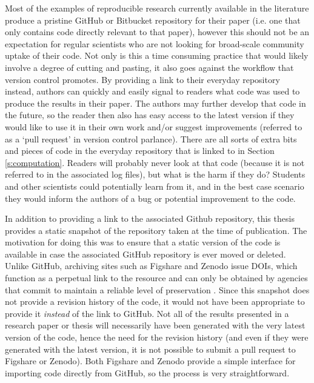Most of the examples of reproducible research currently available in the literature produce a pristine GitHub or Bitbucket repository for their paper (i.e. one that only contains code directly relevant to that paper), however this should not be an expectation for regular scientists who are not looking for broad-scale community uptake of their code. Not only is this a time consuming practice that would likely involve a degree of cutting and pasting, it also goes against the workflow that version control promotes. By providing a link to their everyday repository instead, authors can quickly and easily signal to readers what code was used to produce the results in their paper. The authors may further develop that code in the future, so the reader then also has easy access to the latest version if they would like to use it in their own work and/or suggest improvements (referred to as a `pull request' in version control parlance). There are all sorts of extra bits and pieces of code in the everyday repository that is linked to in Section \ref{s:computation}. Readers will probably never look at that code (because it is not referred to in the associated log files), but what is the harm if they do? Students and other scientists could potentially learn from it, and in the best case scenario they would inform the authors of a bug or potential improvement to the code.        

In addition to providing a link to the associated Github repository, this thesis provides \citep[on Figshare;][]{IrvingFigshare2016} a static snapshot of the repository taken at the time of publication. The motivation for doing this was to ensure that a static version of the code is available in case the associated GitHub repository is ever moved or deleted. Unlike GitHub, archiving sites such as Figshare and Zenodo issue DOIs, which function as a perpetual link to the resource and can only be obtained by agencies that commit to maintain a reliable level of preservation \citep{Potter2015}. Since this snapshot does not provide a revision history of the code, it would not have been appropriate to provide it \textit{instead} of the link to GitHub. Not all of the results presented in a research paper or thesis will necessarily have been generated with the very latest version of the code, hence the need for the revision history (and even if they were generated with the latest version, it is not possible to submit a pull request to Figshare or Zenodo). Both Figshare and Zenodo provide a simple interface for importing code directly from GitHub, so the process is very straightforward.

